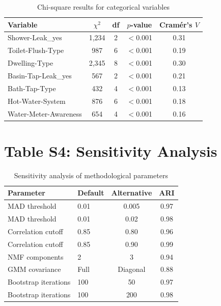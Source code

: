 \documentclass[a4paper,12pt]{article}
\begin{document}
\begin{table}[htbp]
    \centering
    \caption{Chi-square results for categorical variables}
    \begin{tabular}{lcccc}
        \toprule
        Variable & $\chi^2$ & df & $p$-value & Cram\'{e}r's $V$ \\
        \midrule
        Shower-Leak\_yes & 1,234 & 2 & $<$0.001 & 0.31 \\
        Toilet-Flush-Type & 987 & 6 & $<$0.001 & 0.19 \\
        Dwelling-Type & 2,345 & 8 & $<$0.001 & 0.30 \\
        Basin-Tap-Leak\_yes & 567 & 2 & $<$0.001 & 0.21 \\
        Bath-Tap-Type & 432 & 4 & $<$0.001 & 0.13 \\
        Hot-Water-System & 876 & 6 & $<$0.001 & 0.18 \\
        Water-Meter-Awareness & 654 & 4 & $<$0.001 & 0.16 \\
        \bottomrule
    \end{tabular}
\end{table}

\section{Table S4: Sensitivity Analysis}

\begin{table}[htbp]
    \centering
    \caption{Sensitivity analysis of methodological parameters}
    \begin{tabular}{llcc}
        \toprule
        Parameter & Default & Alternative & ARI \\
        \midrule
        MAD threshold & 0.01 & 0.005 & 0.97 \\
        MAD threshold & 0.01 & 0.02 & 0.98 \\
        Correlation cutoff & 0.85 & 0.80 & 0.96 \\
        Correlation cutoff & 0.85 & 0.90 & 0.99 \\
        NMF components & 2 & 3 & 0.94 \\
        GMM covariance & Full & Diagonal & 0.88 \\
        Bootstrap iterations & 100 & 50 & 0.97 \\
        Bootstrap iterations & 100 & 200 & 0.98 \\
        \bottomrule
    \end{tabular}
\end{table}
\end{document}
